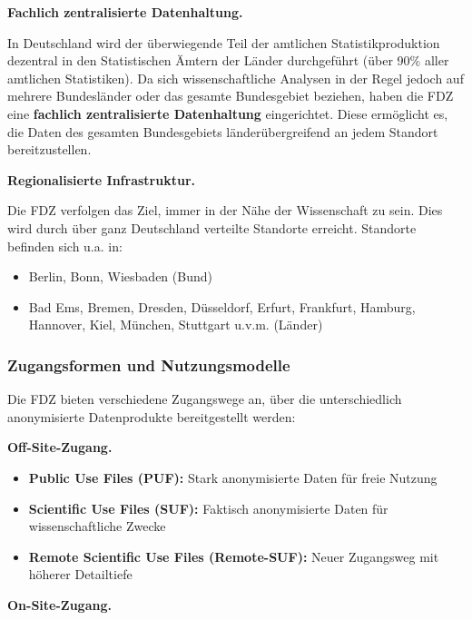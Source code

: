 \documentclass[
  german,
  10pt,
  twoside]{article}
\providecommand{\tightlist}{%
  \setlength{\itemsep}{0pt}\setlength{\parskip}{0pt}}
\begin{document}
\textbf{Fachlich zentralisierte Datenhaltung.}

In Deutschland wird der überwiegende Teil der amtlichen
Statistikproduktion dezentral in den Statistischen Ämtern der Länder
durchgeführt (über 90\% aller amtlichen Statistiken). Da sich
wissenschaftliche Analysen in der Regel jedoch auf mehrere Bundesländer
oder das gesamte Bundesgebiet beziehen, haben die FDZ eine
\textbf{fachlich zentralisierte Datenhaltung} eingerichtet. Diese
ermöglicht es, die Daten des gesamten Bundesgebiets länderübergreifend
an jedem Standort bereitzustellen.

\textbf{Regionalisierte Infrastruktur.}

Die FDZ verfolgen das Ziel, immer in der Nähe der Wissenschaft zu sein.
Dies wird durch über ganz Deutschland verteilte Standorte erreicht.
Standorte befinden sich u.a. in:

\begin{itemize}
\tightlist
\item
  Berlin, Bonn, Wiesbaden (Bund)
\item
  Bad Ems, Bremen, Dresden, Düsseldorf, Erfurt, Frankfurt, Hamburg,
  Hannover, Kiel, München, Stuttgart u.v.m. (Länder)
\end{itemize}

\subsubsection{Zugangsformen und
Nutzungsmodelle}\label{zugangsformen-und-nutzungsmodelle}

Die FDZ bieten verschiedene Zugangswege an, über die unterschiedlich
anonymisierte Datenprodukte bereitgestellt werden:

\textbf{Off-Site-Zugang.}

\begin{itemize}
\tightlist
\item
  \textbf{Public Use Files (PUF):} Stark anonymisierte Daten für freie
  Nutzung
\item
  \textbf{Scientific Use Files (SUF):} Faktisch anonymisierte Daten für
  wissenschaftliche Zwecke
\item
  \textbf{Remote Scientific Use Files (Remote-SUF):} Neuer Zugangsweg
  mit höherer Detailtiefe
\end{itemize}

\textbf{On-Site-Zugang.}
\end{document}
